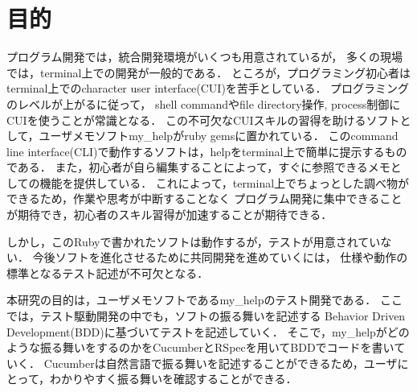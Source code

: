\section{目的}
プログラム開発では，統合開発環境がいくつも用意されているが，
多くの現場では，terminal上での開発が一般的である．
ところが，プログラミング初心者はterminal上でのcharacter user interface(CUI)を苦手としている．
プログラミングのレベルが上がるに従って，
shell commandやfile directory操作, process制御にCUIを使うことが常識となる．
この不可欠なCUIスキルの習得を助けるソフトとして，ユーザメモソフトmy\_helpがruby gemsに置かれている．
このcommand line interface(CLI)で動作するソフトは，helpをterminal上で簡単に提示するものである．
また，初心者が自ら編集することによって，すぐに参照できるメモとしての機能を提供している．
これによって，terminal上でちょっとした調べ物ができるため，作業や思考が中断することなく
プログラム開発に集中できることが期待でき，初心者のスキル習得が加速することが期待できる．

しかし，このRubyで書かれたソフトは動作するが，テストが用意されていない．
今後ソフトを進化させるために共同開発を進めていくには，
仕様や動作の標準となるテスト記述が不可欠となる．

本研究の目的は，ユーザメモソフトであるmy\_helpのテスト開発である．
ここでは，テスト駆動開発の中でも，ソフトの振る舞いを記述する
Behavior Driven Development(BDD)に基づいてテストを記述していく．
そこで，my\_helpがどのような振る舞いをするのかをCucumberとRSpecを用いてBDDでコードを書いていく．
Cucumberは自然言語で振る舞いを記述することができるため，ユーザにとって，わかりやすく振る舞いを確認することができる．

